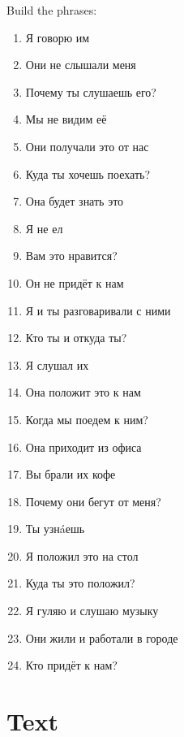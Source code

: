 \documentclass{tstextbook}
\begin{document}
	\begin{programming}
		Build the phrases:
		\begin{enumerate}
			\item Я говорю им
			\item Они не слышали меня
			\item Почему ты слушаешь его?
			\item Мы не видим её
			\item Они получали это от нас
			\item Куда ты хочешь поехать?
			\item Она будет знать это
			\item Я не ел
			\item Вам это нравится?
			\item Он не придёт к нам
			\item Я и ты разговаривали с ними
			\item Кто ты и откуда ты?
			\item Я слушал их
			\item Она положит это к нам
			\item Когда мы поедем к ним?
			\item Она приходит из офиса
			\item Вы брали их кофе
			\item Почему они бегут от меня?
			\item Ты узн\'aешь
			\item Я положил это на стол
			\item Куда ты это положил?
			\item Я гуляю и слушаю музыку
			\item Они жили и работали в городе
			\item Кто придёт к нам?
		\end{enumerate}
	\end{programming}

	\newpage
	
	\section{Text}
	
\end{document}
